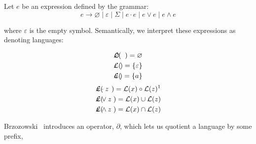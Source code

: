 \documentclass[sigplan,review,acmsmall,nonacm,screen,anonymous]{acmart}\settopmatter{printfolios=false,printccs=false,printacmref=false}
\begin{document}
\begin{definition}
  Let \( e \) be an expression defined by the grammar:
  \[
    e \rightarrow \varnothing \mid \varepsilon \mid \Sigma \mid e \cdot e \mid e \lor e \mid e \land e
  \]

where $\varepsilon$ is the empty symbol. Semantically, we interpret these expressions as denoting languages:\vspace{-0.8cm}

  \setlength{\columnseprule}{0pt}
  \setlength{\columnsep}{-3cm}
  \begin{multicols}{2}
    \begin{eqnarray*}
      \mathcal{L}(&\hspace{-0.35cm} \varnothing \hspace{-0.35cm}&) = \varnothing \\
      \mathcal{L}(&\hspace{-0.35cm} \varepsilon \hspace{-0.35cm}&) = \{\varepsilon\} \\
      \mathcal{L}(&\hspace{-0.35cm} a           \hspace{-0.35cm}&) = \{a\}
    \end{eqnarray*} \break\vspace{-0.45cm}
    \begin{eqnarray*}
      \mathcal{L}(&\hspace{-0.35cm} x\cdot z \hspace{-0.35cm}&) = \mathcal{L}(x) \circ \mathcal{L}(z)\text{\footnotemark}\\
      \mathcal{L}(&\hspace{-0.35cm} x\vee  z \hspace{-0.35cm}&) = \mathcal{L}(x) \cup  \mathcal{L}(z)\\
      \mathcal{L}(&\hspace{-0.35cm} x\land z \hspace{-0.35cm}&) = \mathcal{L}(x) \cap  \mathcal{L}(z)
    \end{eqnarray*}
  \end{multicols}
\end{definition}\vspace{-0.2cm}

\noindent Brzozowski~\cite{brzozowski1964derivatives} introduces an operator, $\partial$, which lets us quotient a language by some prefix,
\end{document}
